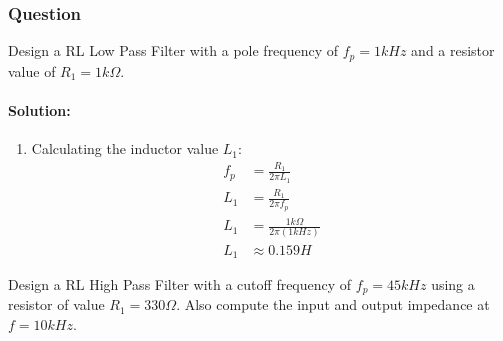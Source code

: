 \subsubsection{Question}
Design a RL Low Pass Filter with a pole frequency of
\(f_p = 1 kHz\) and a resistor value of \(R_1 = 1 k\Omega\).
\paragraph{Solution:}
\begin{enumerate}
  \item Calculating the inductor value \(L_1\):
    \begin{align*}
      f_p &= \frac{R_1}{2 \pi L_1} \\
      L_1 &= \frac{R_1}{2 \pi f_p} \\
      L_1 &= \frac{1 k\Omega}{2 \pi (1 kHz)} \\
      L_1 &\approx 0.159 H
    \end{align*}
\end{enumerate}
Design a RL High Pass Filter with a cutoff frequency of
\(f_p = 45kHz\) using a resistor of value \(R_1 = 330 \Omega\).
Also compute the input and output impedance at \(f = 10kHz\).
